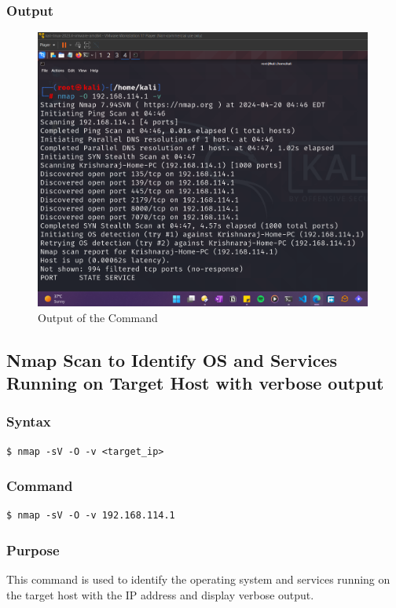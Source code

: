 \documentclass[11pt]{article}
\begin{document}
\subsubsection*{Output}
\begin{figure}[H]
    \centering
    \includegraphics[width=0.99\textwidth]{a3_ss (1).png}
    \caption{Output of the Command}
\end{figure}

\subsection{Nmap Scan to Identify OS and Services Running on Target Host with verbose output}

\subsubsection*{Syntax}
\begin{verbatim}
$ nmap -sV -O -v <target_ip>
\end{verbatim}

\subsubsection*{Command}
\begin{verbatim}
$ nmap -sV -O -v 192.168.114.1
\end{verbatim}

\subsubsection*{Purpose}
This command is used to identify the operating system and services running on the target host with the IP address and display verbose output.
\end{document}
